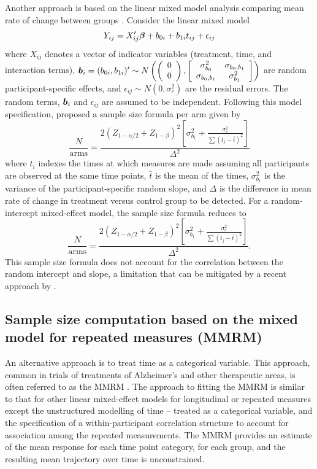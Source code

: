 Another approach is based on the linear mixed model analysis \citep{Fitzmaurice_Laird_Ware(2004)} comparing mean rate of change between groups \citep{Edland(2009),Zhao_Edland(2020)}. Consider the linear mixed model $$Y_{ij}=X'_{ij}\mbox{\boldmath $\beta$}+b_{0i}+b_{1i}t_{ij}+\epsilon_{ij}$$
where $X_{ij}$ denotes a vector of indicator variables (treatment, time, and interaction terms), $\mbox{\boldmath $b$}_i=(b_{0i},b_{1i})'\sim N\left(\left(\begin{array}{cc}
0\\0
\end{array}\right),\left[\begin{array}{cc}
\sigma^2_{b_0}&\sigma_{b_{0},b_{1}}\\
\sigma_{b_{0},b_1}&\sigma^2_{b_1}
\end{array}\right]\right)$ are random participant-specific effects, and $\epsilon_{ij}\sim N(0,\sigma^2_e)$ are the residual errors. The random terms, $\mbox{\boldmath $b$}_i$ and $\epsilon_{ij}$ are assumed to be independent. Following this model specification, \cite{Edland(2009)} proposed a sample size formula per arm given by
$$\frac{N}{\mbox{arms}}=\frac{2\left(Z_{1-\alpha/2}+Z_{1-\beta}\right)^2\left[\sigma^2_{b_1}+\frac{\sigma^2_e}{\sum (t_j-\bar{t})^2}\right]}{\Delta^2}$$
where $t_i$ indexes the times at which measures are made assuming all participants are
observed at the same time points, $\bar{t}$ is the mean of the times, $\sigma^2_{b_1}$ is the variance of the participant-specific random slope, and $\Delta$ is the difference in mean rate of change in treatment versus control group to be detected. For a random-intercept mixed-effect model, the sample size formula reduces to 
$$\frac{N}{\mbox{arms}}=\frac{2\left(Z_{1-\alpha/2}+Z_{1-\beta}\right)^2\left[\sigma^2_{b_1}+\frac{\sigma^2_e}{\sum (t_j-\bar{t})^2}\right]}{\Delta^2}.$$
This sample size formula does not account for the correlation between the random intercept and slope, a limitation that can be mitigated by a recent approach by \cite{Hu_Mackey_Thomas(2021)}.

\subsection{Sample size computation based on the mixed model for repeated measures (MMRM)}
\label{model2}
An alternative approach is to treat time as a categorical variable. This approach, common in trials of treatments of Alzheimer’s and other therapeutic areas, is often referred to as the MMRM \citep{Mallinckrodt_etal(2001),Mallinckrodt_etal(2003),Lane(2008)}. The approach to fitting the MMRM is similar to that for other linear mixed-effect models for longitudinal or repeated measures except the unstructured modelling of time – treated as a categorical variable, and the specification of a within-participant correlation structure to account for association among the repeated measurements. The MMRM provides an estimate of the mean response for each time point category, for each group, and the resulting mean trajectory over time is unconstrained.

